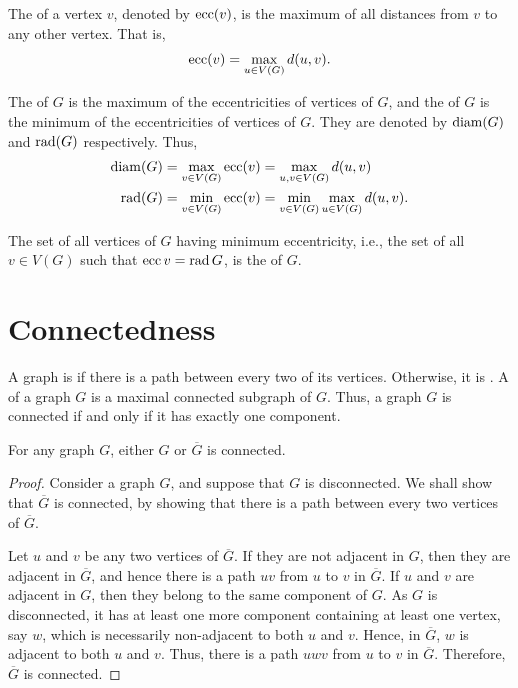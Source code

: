 The  of a vertex $v$, denoted by $\operatorname{ecc}(v)$, is the maximum of all distances from $v$ to any other vertex. That is,
\begin{equation*}
    \operatorname{ecc}(v) = \max_{u \in V(G)} d(u, v) .
\end{equation*}

The  of $G$ is the maximum of the eccentricities of vertices of $G$, and the  of $G$ is the minimum of the eccentricities of vertices of $G$. They are denoted by $\operatorname{diam}(G)$ and $\operatorname{rad}(G)$ respectively. Thus,
\begin{align*}
    \operatorname{diam}(G) & = \max_{v \in V(G)} \operatorname{ecc}(v)= \max_{u, v \in V(G)} d(u, v) \\
    \operatorname{rad}(G) & = \min_{v \in V(G)}\operatorname{ecc}(v) = \min_{v \in V(G)} \max_{u \in V(G)} d(u, v).
\end{align*}

The set of all vertices of $G$ having minimum eccentricity, i.e., the set of all $v \in V(G)$ such that $\operatorname{ecc} v = \operatorname{rad} G$, is the  of $G$.

\section{Connectedness}\label{sec:Connectedness}

A graph is  if there is a path between every two of its vertices. Otherwise, it is . A  of a graph $G$ is a maximal connected subgraph of $G$. Thus, a graph $G$ is connected if and only if it has exactly one component.

\begin{Theorem}\label{thm:GorGCompConn}
For any graph $G$, either $G$ or $\overline G$ is connected.
\end{Theorem}

\begin{proof}
Consider a graph $G$, and suppose that $G$ is disconnected. We shall show that $\overline G$ is connected, by showing that there is a path between every two vertices of $\overline G$.

Let $u$ and $v$ be any two vertices of $\overline G$. If they are not adjacent in $G$, then they are adjacent in $\overline G$, and hence there is a path $uv$ from $u$ to $v$ in $\overline G$. If $u$ and $v$ are adjacent in $G$, then they belong to the same component of $G$. As $G$ is disconnected, it has at least one more component containing at least one vertex, say $w$, which is necessarily non-adjacent to both $u$ and $v$. Hence, in $\overline G$, $w$ is adjacent to both $u$ and $v$. Thus, there is a path $uwv$ from $u$ to $v$ in $\overline G$. Therefore, $\overline G$ is connected.
\end{proof}

